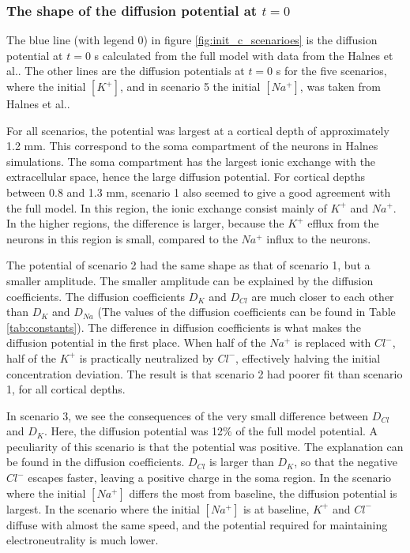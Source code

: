 \documentclass{article}
\begin{document}
\subsubsection{The shape of the diffusion potential at $t=0$}

The blue line (with legend 0) in figure \ref{fig:init_c_scenarioes} is the diffusion potential at $t=0$ s calculated from the full model with data from the Halnes et al.\cite{Halnes2016}. The other lines are the diffusion potentials at $t=0$ s for the five scenarios, where the initial $[K^+]$, and in scenario 5 the initial $[Na^+]$, was taken from Halnes et al..  

For all scenarios, the potential was largest at a cortical depth of approximately 1.2 mm. This correspond to the soma compartment of the neurons in Halnes simulations. The soma compartment has the largest ionic exchange with the extracellular space, hence the large diffusion potential. For cortical depths between 0.8 and 1.3 mm, scenario 1 also seemed to give a good agreement with the full model. In this region, the ionic exchange consist mainly of $K^+$ and $Na^+$. In the higher regions, the difference is larger, because the $K^+$ efflux from the neurons in this region is small, compared to the $Na^+$ influx to the neurons.

The potential of scenario 2 had the same shape as that of scenario 1, but a smaller amplitude. The smaller amplitude can be explained by the diffusion coefficients. The diffusion coefficients $D_K$ and $D_{Cl}$ are much closer to each other than $D_K$ and $D_{Na}$ (The values of the diffusion coefficients can be found in Table \ref{tab:constants}).  The difference in diffusion coefficients is what makes the diffusion potential in the first place. When half of the $Na^+ $ is replaced with $Cl^-$, half of the $K^+$ is practically neutralized by $Cl^-$, effectively halving the initial concentration deviation. The result is that scenario 2 had poorer fit than scenario 1, for all cortical depths. 

In scenario 3, we see the consequences of the very small difference between $D_{Cl}$ and $D_K$. Here, the diffusion potential was 12\% of the full model potential. A peculiarity of this scenario is that the potential was positive. The explanation can be found in the diffusion coefficients. $D_{Cl}$ is larger than $D_K$, so that the negative $Cl^-$ escapes faster, leaving a positive charge in the soma region. In the scenario where the initial $[Na^+]$ differs the most from baseline, the diffusion potential is largest. In the scenario where the initial $[Na^+]$ is at baseline, $K^+$ and $Cl^-$ diffuse with almost the same speed, and the potential required for maintaining electroneutrality is much lower. 
\end{document}
